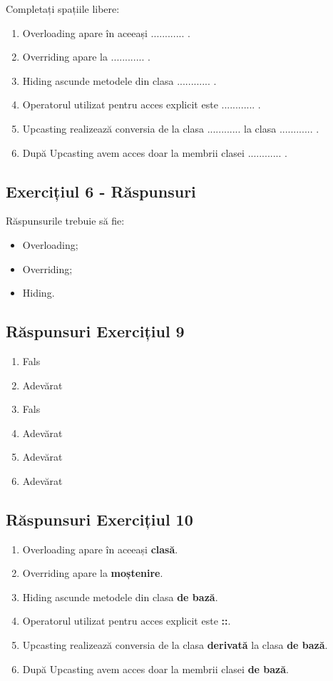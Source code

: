 \documentclass[12pt,a4paper]{article}
\begin{document}
Completați spațiile libere:

\begin{enumerate}
\item Overloading apare în aceeași ............ .
\item Overriding apare la ............ .
\item Hiding ascunde metodele din clasa ............ .
\item Operatorul utilizat pentru acces explicit este ............ .
\item Upcasting realizează conversia de la clasa ............ la clasa ............ .
\item După Upcasting avem acces doar la membrii clasei ............ .
\end{enumerate}


\subsection{Exercițiul 6 - Răspunsuri}
Răspunsurile trebuie să fie:

\begin{itemize}
\item Overloading;
\item Overriding;
\item Hiding.
\end{itemize}

\subsection{Răspunsuri Exercițiul 9}

\begin{enumerate}
\item Fals
\item Adevărat
\item Fals
\item Adevărat
\item Adevărat
\item Adevărat
\end{enumerate}

\subsection{Răspunsuri Exercițiul 10}

\begin{enumerate}
\item Overloading apare în aceeași \textbf{clasă}.
\item Overriding apare la \textbf{moștenire}.
\item Hiding ascunde metodele din clasa \textbf{de bază}.
\item Operatorul utilizat pentru acces explicit este \textbf{::}.
\item Upcasting realizează conversia de la clasa \textbf{derivată} la clasa \textbf{de bază}.
\item După Upcasting avem acces doar la membrii clasei \textbf{de bază}.
\end{enumerate}
\end{document}
